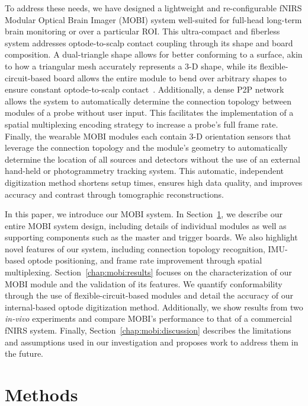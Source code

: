 To address these needs, we have designed a lightweight and re-configurable \ac{fNIRS} Modular Optical Brain Imager (\ac{MOBI}) system well-suited for full-head long-term brain monitoring or over a particular \ac{ROI}. This ultra-compact and fiberless system addresses optode-to-scalp contact coupling through its shape and board composition. A dual-triangle shape allows for better conforming to a surface, akin to how a triangular mesh accurately represents a 3-D shape, while its flexible-circuit-based board allows the entire module to bend over arbitrary shapes to ensure constant optode-to-scalp contact~\cite{Bartkowski2019, Muehlemann2008}. Additionally, a dense \ac{P2P} network allows the system to automatically determine the connection topology between modules of a probe without user input. This facilitates the implementation of a spatial multiplexing encoding strategy to increase a probe's full frame rate. Finally, the wearable \ac{MOBI} modules each contain 3-D orientation sensors that leverage the connection topology and the module's geometry to automatically determine the location of all sources and detectors without the use of an external hand-held or photogrammetry tracking system. This automatic, independent digitization method shortens setup times, ensures high data quality, and improves accuracy and contrast through tomographic reconstructions.

In this paper, we introduce our \ac{MOBI} system. In Section~\ref{chap:mobi:methods}, we describe our entire \ac{MOBI} system design, including details of individual modules as well as supporting components such as the master and trigger boards. We also highlight novel features of our system, including connection topology recognition, IMU-based optode positioning, and frame rate improvement through spatial multiplexing. Section~\ref{chap:mobi:results} focuses on the characterization of our \ac{MOBI} module and the validation of its features. We quantify conformability through the use of flexible-circuit-based modules and detail the accuracy of our internal-based optode digitization method. Additionally, we show results from two \emph{in-vivo} experiments and compare \ac{MOBI}'s performance to that of a commercial \ac{fNIRS} system. Finally, Section~\ref{chap:mobi:discussion} describes the limitations and assumptions used in our investigation and proposes work to address them in the future.  




\section{Methods}
\label{chap:mobi:methods}

